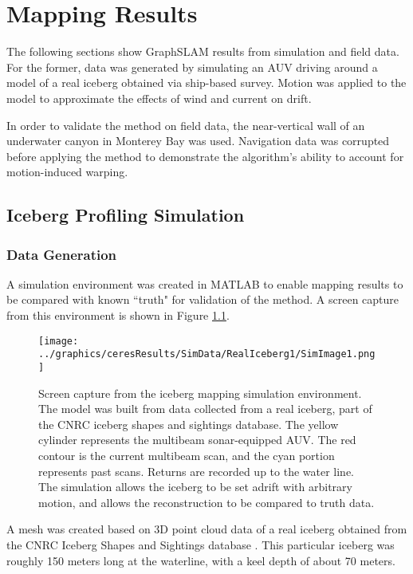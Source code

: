 
\chapter{Mapping Results}
\label{ch.Results}

The following sections show GraphSLAM results from simulation and field data. For the former, data was generated by simulating an AUV driving around a model of a real iceberg obtained via ship-based survey. Motion was applied to the model to approximate the effects of wind and current on drift.

In order to validate the method on field data, the near-vertical wall of an underwater canyon in Monterey Bay was used. Navigation data was corrupted before applying the method to demonstrate the algorithm's ability to account for motion-induced warping.

\section{Iceberg Profiling Simulation}

\subsection{Data Generation}

A simulation environment was created in MATLAB to enable mapping results to be compared with known ``truth" for validation of the method. A screen capture from this environment is shown in Figure \ref{fig:IcebergSim}.
 
 \begin{figure}[!htb]
   \centering
   \texttt{[image: ../graphics/ceresResults/SimData/RealIceberg1/SimImage1.png]} %
   \caption{Screen capture from the iceberg mapping simulation environment. The model was built from data collected from a real iceberg, part of the CNRC iceberg shapes and sightings database. The yellow cylinder represents the multibeam sonar-equipped AUV. The red contour is the current multibeam scan, and the cyan portion represents past scans. Returns are recorded up to the water line. The simulation allows the iceberg to be set adrift with arbitrary motion, and allows the reconstruction to be compared to truth data.}
   \label{fig:IcebergSim}
\end{figure}

A mesh was created based on 3D point cloud data of a real iceberg obtained from the CNRC Iceberg Shapes and Sightings database \cite{Verbit2006}. This particular iceberg was roughly 150 meters long at the waterline, with a keel depth of about 70 meters.

